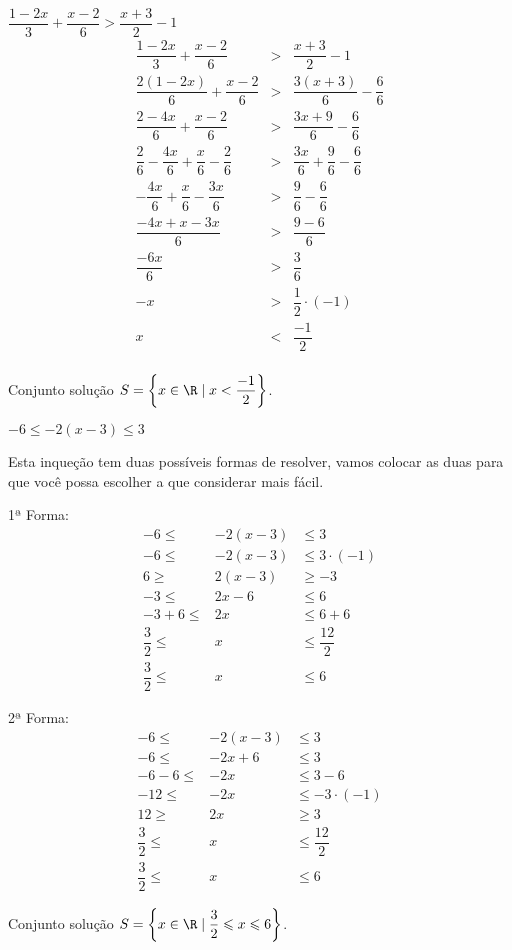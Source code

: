 \begin{exem}
$\dfrac{1-2x}{3} + \dfrac{x-2}{6} > \dfrac{x+3}{2} - 1$
  \begin{eqnarray*}
  \dfrac{1-2x}{3} + \dfrac{x-2}{6} &>& \dfrac{x+3}{2} - 1 \\
  \dfrac{2(1-2x)}{6} + \dfrac{x-2}{6} &>& \dfrac{3(x+3)}{6} - \dfrac{6}{6} \\
  \dfrac{2 - 4x}{6} + \dfrac{x-2}{6} &>& \dfrac{3x+9}{6} - \dfrac{6}{6} \\
  \dfrac{2}{6}- \dfrac{4x}{6}+ \dfrac{x}{6}- \dfrac{2}{6} &>& \dfrac{3x}{6}+ \dfrac{9}{6} - \dfrac{6}{6} \\
  - \dfrac{4x}{6} + \dfrac{x}{6} - \dfrac{3x}{6} &>& \dfrac{9}{6} - \dfrac{6}{6} \\
  \dfrac{-4x+x-3x}{6} &>& \dfrac{9-6}{6} \\
  \dfrac{-6x}{6} &>& \dfrac{3}{6} \\
  -x &>& \dfrac{1}{2} \cdot(-1)\\
   x &<& \dfrac{-1}{2} \\
  \end{eqnarray*}
 
 Conjunto solução $S=\left\{x \in \R \mid x < \dfrac{-1}{2} \right\}$.
\end{exem}

\begin{exem}
$-6 \leqslant -2(x-3) \leqslant 3$

Esta inqueção tem duas possíveis formas de resolver, vamos colocar as duas para que você possa escolher a que considerar mais fácil.

1ª Forma:
 \begin{eqnarray*}
   -6 \leqslant & -2(x-3) & \leqslant 3 \\
   -6 \leqslant & -2(x-3) & \leqslant 3 \cdot (-1)\\
   6 \geqslant & 2(x-3) & \geqslant -3 \\
   -3 \leqslant & 2x - 6 & \leqslant 6 \\
   -3+6 \leqslant & 2x & \leqslant 6+6 \\
   \dfrac{3}{2} \leqslant & x & \leqslant \dfrac{12}{2} \\
   \dfrac{3}{2} \leqslant & x & \leqslant 6
 \end{eqnarray*}
 
   
2ª Forma:
 \begin{eqnarray*}
    -6 \leqslant & -2(x-3) & \leqslant 3 \\
   -6 \leqslant & -2x + 6 & \leqslant 3 \\
   -6-6 \leqslant & -2x & \leqslant 3-6  \\
   -12 \leqslant & -2x & \leqslant -3 \cdot (-1) \\
   12 \geqslant & 2x & \geqslant 3 \\
   \dfrac{3}{2} \leqslant & x & \leqslant \dfrac{12}{2} \\
   \dfrac{3}{2} \leqslant & x & \leqslant 6
 \end{eqnarray*}
      
  Conjunto solução $S= \left\{x \in \R \mid \dfrac{3}{2} \leqslant x \leqslant 6 \right\}$.

\end{exem} 

